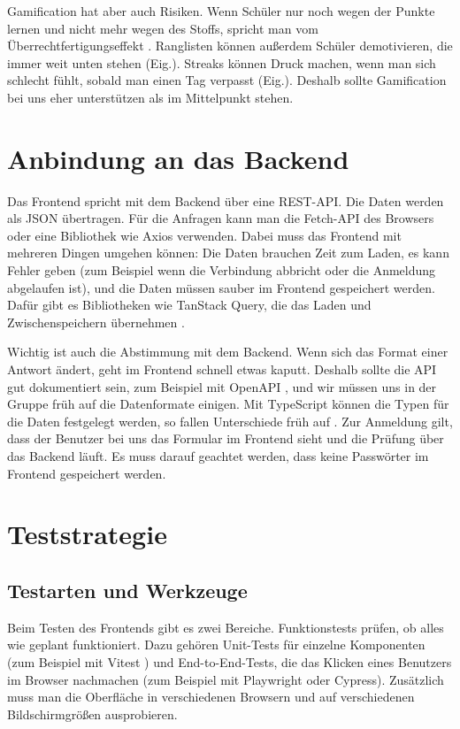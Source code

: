 Gamification hat aber auch Risiken. Wenn Schüler nur noch wegen der Punkte lernen und nicht mehr wegen des Stoffs, spricht man vom Überrechtfertigungseffekt \parencite{lepper1973}. Ranglisten können außerdem Schüler demotivieren, die immer weit unten stehen (Eig.). Streaks können Druck machen, wenn man sich schlecht fühlt, sobald man einen Tag verpasst (Eig.). Deshalb sollte Gamification bei uns eher unterstützen als im Mittelpunkt stehen.
 
\section{Anbindung an das Backend}
 
Das Frontend spricht mit dem Backend über eine REST-API. Die Daten werden als JSON übertragen. Für die Anfragen kann man die Fetch-API des Browsers oder eine Bibliothek wie Axios \parencite{axios} verwenden. Dabei muss das Frontend mit mehreren Dingen umgehen können: Die Daten brauchen Zeit zum Laden, es kann Fehler geben (zum Beispiel wenn die Verbindung abbricht oder die Anmeldung abgelaufen ist), und die Daten müssen sauber im Frontend gespeichert werden. Dafür gibt es Bibliotheken wie TanStack Query, die das Laden und Zwischenspeichern übernehmen \parencite{tanstack2026}.
 
Wichtig ist auch die Abstimmung mit dem Backend. Wenn sich das Format einer Antwort ändert, geht im Frontend schnell etwas kaputt. Deshalb sollte die API gut dokumentiert sein, zum Beispiel mit OpenAPI \parencite{openapi}, und wir müssen uns in der Gruppe früh auf die Datenformate einigen. Mit TypeScript können die Typen für die Daten festgelegt werden, so fallen Unterschiede früh auf \parencite{typescript}. Zur Anmeldung gilt, dass der Benutzer bei uns das Formular im Frontend sieht und die Prüfung über das Backend läuft. Es muss darauf geachtet werden, dass keine Passwörter im Frontend gespeichert werden.
 
\section{Teststrategie}
\label{sec:tests-frontend}
 
\subsection{Testarten und Werkzeuge}
 
Beim Testen des Frontends gibt es zwei Bereiche. Funktionstests prüfen, ob alles wie geplant funktioniert. Dazu gehören Unit-Tests für einzelne Komponenten (zum Beispiel mit Vitest \parencite{vitest}) und End-to-End-Tests, die das Klicken eines Benutzers im Browser nachmachen (zum Beispiel mit Playwright \parencite{playwright} oder Cypress). Zusätzlich muss man die Oberfläche in verschiedenen Browsern und auf verschiedenen Bildschirmgrößen ausprobieren.
 
